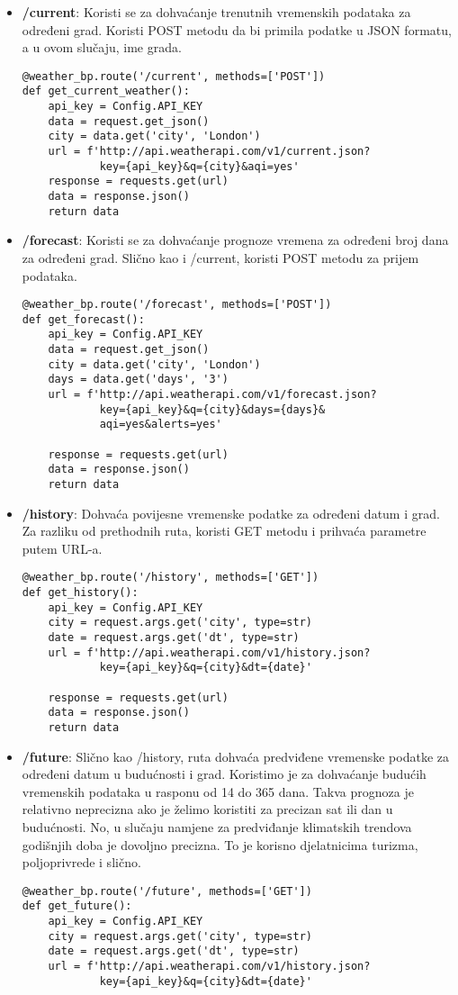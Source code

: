 \documentclass[times, utf8, zavrsni]{fer}
\begin{document}
\begin{itemize}
\item \textbf{/current}: Koristi se za dohvaćanje trenutnih vremenskih podataka za određeni grad. Koristi POST metodu da bi primila podatke u JSON formatu, a u ovom slučaju, ime grada.
\begin{verbatim}
@weather_bp.route('/current', methods=['POST'])
def get_current_weather():
    api_key = Config.API_KEY
    data = request.get_json()
    city = data.get('city', 'London')
    url = f'http://api.weatherapi.com/v1/current.json?
            key={api_key}&q={city}&aqi=yes'
    response = requests.get(url)
    data = response.json()
    return data
\end{verbatim}
\item \textbf{/forecast}: Koristi se za dohvaćanje prognoze vremena za određeni broj dana za određeni grad. Slično kao i /current, koristi POST metodu za prijem podataka.
\newpage
\begin{verbatim}
@weather_bp.route('/forecast', methods=['POST'])
def get_forecast():
    api_key = Config.API_KEY
    data = request.get_json()
    city = data.get('city', 'London')
    days = data.get('days', '3')
    url = f'http://api.weatherapi.com/v1/forecast.json?
            key={api_key}&q={city}&days={days}&
            aqi=yes&alerts=yes'

    response = requests.get(url)
    data = response.json()
    return data
\end{verbatim}
\item \textbf{/history}: Dohvaća povijesne vremenske podatke za određeni datum i grad. Za razliku od prethodnih ruta, koristi GET metodu i prihvaća parametre putem URL-a.
\begin{verbatim}
@weather_bp.route('/history', methods=['GET'])
def get_history():
    api_key = Config.API_KEY
    city = request.args.get('city', type=str)
    date = request.args.get('dt', type=str)
    url = f'http://api.weatherapi.com/v1/history.json?
            key={api_key}&q={city}&dt={date}'

    response = requests.get(url)
    data = response.json()
    return data
\end{verbatim}
\item \textbf{/future}: Slično kao /history, ruta dohvaća predviđene vremenske podatke za određeni datum u budućnosti i grad. Koristimo je za dohvaćanje budućih vremenskih podataka u rasponu od 14 do 365 dana. Takva prognoza je relativno neprecizna ako je želimo koristiti za precizan sat ili dan u budućnosti. No, u slučaju namjene za predviđanje klimatskih trendova godišnjih doba je dovoljno precizna. To je korisno djelatnicima turizma, poljoprivrede i slično.
\begin{verbatim}
@weather_bp.route('/future', methods=['GET'])
def get_future():
    api_key = Config.API_KEY
    city = request.args.get('city', type=str)
    date = request.args.get('dt', type=str)
    url = f'http://api.weatherapi.com/v1/history.json?
            key={api_key}&q={city}&dt={date}'


\end{verbatim}
\end{itemize}
\end{document}
